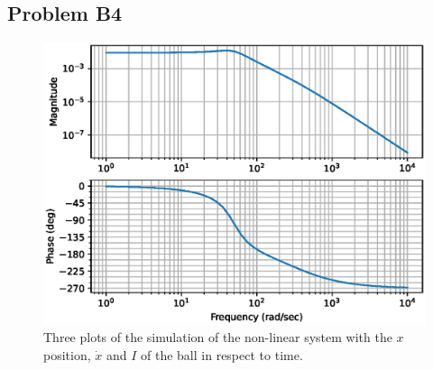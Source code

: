 \subsection*{Problem B4}
    \hfill
    \begin{figure}[H]
        \centering
        \includegraphics[width=0.6\linewidth]{figures/problem_b4.eps}
        \caption{Three plots of the simulation of the non-linear system with the \(x\) position, \(\dot{x}\) and \(I\) of the ball in respect to time.}
        \label{fig:problem_b2_a}
    \end{figure}